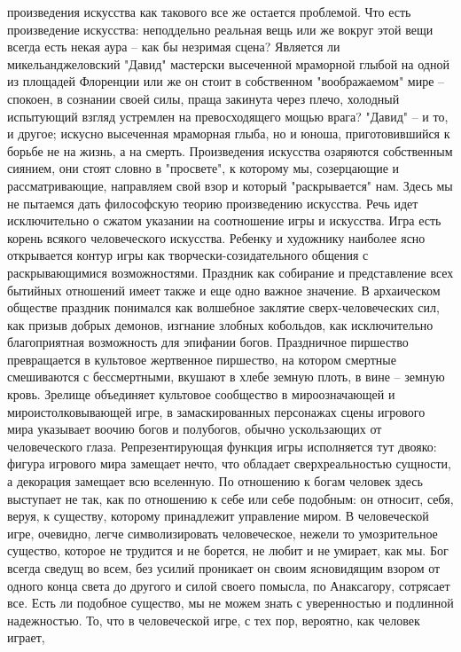 \documentclass[12pt]{article}
\begin{document}
произведения  искусства  как  такового  все  же  остается  проблемой.  Что  есть  произведение  искусства:
неподдельно реальная вещь или же вокруг этой вещи всегда есть некая аура -- как бы незримая сцена? Является
ли микельанджеловский "Давид" мастерски высеченной мраморной глыбой на одной из площадей Флоренции
или же он стоит в собственном "воображаемом" мире -- спокоен, в сознании своей силы, праща закинута через
плечо, холодный испытующий взгляд устремлен на превосходящего мощью врага? "Давид" -- и то, и другое;
искусно высеченная мраморная глыба, но и юноша, приготовившийся к борьбе не на жизнь, а на смерть.
Произведения  искусства  озаряются собственным сиянием,  они  стоят словно в "просвете",  к которому мы,
созерцающие и рассматривающие, направляем свой взор и который "раскрывается" нам. Здесь мы не пытаемся
дать  философскую  теорию  произведению  искусства.  Речь  идет  исключительно  о  сжатом  указании  на
соотношение  игры  и  искусства.  Игра  есть  корень  всякого  человеческого  искусства.  Ребенку  и  художнику
наиболее  ясно  открывается  контур  игры  как  творчески-созидательного  общения  с  раскрывающимися
возможностями. Праздник как собирание и представление всех бытийных отношений имеет также и еще одно
важное значение. В архаическом обществе праздник понимался как волшебное заклятие сверх-человеческих
сил, как призыв добрых демонов, изгнание злобных кобольдов, как исключительно благоприятная возможность
для эпифании богов. Праздничное пиршество превращается в культовое жертвенное пиршество, на котором
смертные смешиваются с бессмертными, вкушают в хлебе земную плоть, в вине -- земную кровь. Зрелище
объединяет  культовое  сообщество  в  мироозначающей  и  мироистолковывающей  игре,  в  замаскированных
персонажах сцены игрового мира указывает воочию богов и полубогов, обычно ускользающих от человеческого
глаза. Репрезентирующая функция игры исполняется тут двояко: фигура игрового мира замещает нечто, что 
обладает сверхреальностью сущности, а декорация замещает всю вселенную. По отношению к богам человек
здесь выступает не так, как по отношению к себе или себе подобным: он относит, себя, веруя, к существу,
которому  принадлежит  управление  миром.  В  человеческой  игре,  очевидно,  легче  символизировать
человеческое, нежели то умозрительное существо, которое не трудится и не борется, не любит и не умирает, как
мы. Бог всегда сведущ во всем, без усилий проникает он своим ясновидящим взором от одного конца света до
другого и силой своего помысла, по Анаксагору, сотрясает все. Есть ли подобное существо, мы не можем знать
с уверенностью и подлинной надежностью. То, что в человеческой игре, с тех пор, вероятно, как человек играет,
\end{document}
